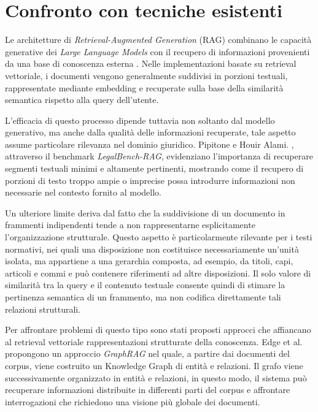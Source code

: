 \section{Confronto con tecniche esistenti}
Le architetture di \textit{Retrieval-Augmented Generation} (RAG) combinano le capacità generative dei \textit{Large Language Models} con il recupero di informazioni provenienti da una base di conoscenza esterna \cite{lewis2020rag}. Nelle implementazioni basate su retrieval vettoriale, i documenti vengono generalmente suddivisi in porzioni testuali, rappresentate mediante embedding e recuperate sulla base della similarità semantica rispetto alla query dell'utente.

L'efficacia di questo processo dipende tuttavia non soltanto dal modello generativo, ma anche dalla qualità delle informazioni recuperate, tale aspetto assume particolare rilevanza nel dominio giuridico. Pipitone e Houir Alami. \cite{pipitone2024legalbenchrag}, attraverso il benchmark \textit{LegalBench-RAG}, evidenziano l'importanza di recuperare segmenti testuali minimi e altamente pertinenti, mostrando come il recupero di porzioni di testo troppo ampie o imprecise possa introdurre informazioni non necessarie nel contesto fornito al modello.

Un ulteriore limite deriva dal fatto che la suddivisione di un documento in frammenti indipendenti tende a non rappresentarne esplicitamente l'organizzazione strutturale. Questo aspetto è particolarmente rilevante per i testi normativi, nei quali una disposizione non costituisce necessariamente un'unità isolata, ma appartiene a una gerarchia composta, ad esempio, da titoli, capi, articoli e commi e può contenere riferimenti ad altre disposizioni. Il solo valore di similarità tra la query e il contenuto testuale consente quindi di stimare la pertinenza semantica di un frammento, ma non codifica direttamente tali relazioni strutturali.

Per affrontare problemi di questo tipo sono stati proposti approcci che affiancano al retrieval vettoriale rappresentazioni strutturate della conoscenza. Edge et al. \cite{edge2024graphrag} propongono un approccio \textit{GraphRAG} nel quale, a partire dai documenti del corpus, viene costruito un Knowledge Graph di entità e relazioni. Il grafo viene successivamente organizzato in entità e relazioni, in questo modo, il sistema può recuperare informazioni distribuite in differenti parti del corpus e affrontare interrogazioni che richiedono una visione più globale dei documenti.

